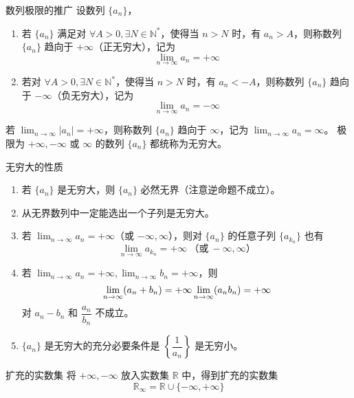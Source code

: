 \begin{definition}{数列极限的推广}
    设数列 $\{a_n\}$，
    \begin{enumerate}
        \item 若 $\{a_n\}$ 满足对 $\forall A > 0, \exists N \in \mathbb{N}^{*}$，使得当 $n > N$ 时，有 $a_n > A$，则称数列 $\{a_n\}$ 趋向于 $+\infty$（正无穷大），记为
              \[\lim_{n \to \infty}a_n = +\infty\]
        \item 若对 $\forall A > 0, \exists N \in \mathbb{N}^{*}$，使得当 $n > N$ 时，有 $a_n < -A$，则称数列 $\{a_n\}$ 趋向于 $-\infty$（负无穷大），记为
              \[\lim_{n \to \infty}a_n = -\infty\]
    \end{enumerate}
\end{definition}

\begin{definition}
    若 $\displaystyle \lim_{n \to \infty}|a_n| = +\infty$，则称数列 $\{a_n\}$ 趋向于 $\infty$，记为 $\displaystyle \lim_{n \to \infty}a_n = \infty$。
    极限为 $+\infty,-\infty$ 或 $\infty$ 的数列 $\{a_n\}$ 都统称为无穷大。
\end{definition}

\begin{theorem}{无穷大的性质}
    \begin{enumerate}
        \item 若 $\{a_n\}$ 是无穷大，则 $\{a_n\}$ 必然无界（注意逆命题不成立）。
        \item 从无界数列中一定能选出一个子列是无穷大。
        \item 若 $\displaystyle \lim_{n \to \infty}a_n = +\infty$（或 $-\infty,\infty$），则对 $\{a_n\}$ 的任意子列 $\{a_{k_n}\}$ 也有
              \[\lim_{n \to \infty}a_{k_n} = +\infty\ \text{（或}\ -\infty,\infty\text{）}\]
        \item 若 $\displaystyle \lim_{n \to \infty}a_n = +\infty,\lim_{n \to \infty}b_n = +\infty$，则
              \[\lim_{n \to \infty}(a_n + b_n) = +\infty \\
                  \lim_{n \to \infty}(a_{n}b_{n}) = +\infty\]
              对 $a_n - b_n$ 和 $\dfrac{a_n}{b_n}$ 不成立。
        \item $\{a_n\}$ 是无穷大的充分必要条件是 $\left\{\dfrac{1}{a_n}\right\}$ 是无穷小。
    \end{enumerate}
\end{theorem}

\begin{definition}{扩充的实数集}
    将 $+\infty, -\infty$ 放入实数集 $\mathbb{R}$ 中，得到扩充的实数集
    \[\mathbb{R}_{\infty} = \mathbb{R} \cup \{-\infty, +\infty\}\]
\end{definition}

